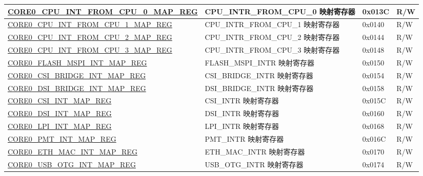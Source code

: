 \begin{longtable}{ | p{8.7cm} | p{6.2cm} | p{1.3cm} | p{1cm} | }
\hyperref[regdesc:CORE0CPUINTFROMCPU0MAPREG]{CORE0\_CPU\_INT\_FROM\_CPU\_0\_MAP\_REG} & CPU\_INTR\_FROM\_CPU\_0 映射寄存器 & 0x013C & R/W \\ \hline

\hyperref[regdesc:CORE0CPUINTFROMCPU1MAPREG]{CORE0\_CPU\_INT\_FROM\_CPU\_1\_MAP\_REG} & CPU\_INTR\_FROM\_CPU\_1 映射寄存器 & 0x0140 & R/W \\ \hline

\hyperref[regdesc:CORE0CPUINTFROMCPU2MAPREG]{CORE0\_CPU\_INT\_FROM\_CPU\_2\_MAP\_REG} & CPU\_INTR\_FROM\_CPU\_2 映射寄存器 & 0x0144 & R/W \\ \hline

\hyperref[regdesc:CORE0CPUINTFROMCPU3MAPREG]{CORE0\_CPU\_INT\_FROM\_CPU\_3\_MAP\_REG} & CPU\_INTR\_FROM\_CPU\_3 映射寄存器 & 0x0148 & R/W \\ \hline

\hyperref[regdesc:CORE0FLASHMSPIINTMAPREG]{CORE0\_FLASH\_MSPI\_INT\_MAP\_REG} & FLASH\_MSPI\_INTR 映射寄存器 & 0x0150 & R/W \\ \hline

\hyperref[regdesc:CORE0CSIBRIDGEINTMAPREG]{CORE0\_CSI\_BRIDGE\_INT\_MAP\_REG} & CSI\_BRIDGE\_INTR 映射寄存器 & 0x0154 & R/W \\ \hline

\hyperref[regdesc:CORE0DSIBRIDGEINTMAPREG]{CORE0\_DSI\_BRIDGE\_INT\_MAP\_REG} & DSI\_BRIDGE\_INTR 映射寄存器 & 0x0158 & R/W \\ \hline

\hyperref[regdesc:CORE0CSIINTMAPREG]{CORE0\_CSI\_INT\_MAP\_REG} & CSI\_INTR 映射寄存器 & 0x015C & R/W \\ \hline

\hyperref[regdesc:CORE0DSIINTMAPREG]{CORE0\_DSI\_INT\_MAP\_REG} & DSI\_INTR 映射寄存器 & 0x0160 & R/W \\ \hline


\hyperref[regdesc:CORE0LPIINTMAPREG]{CORE0\_LPI\_INT\_MAP\_REG} & LPI\_INTR 映射寄存器 & 0x0168 & R/W \\ \hline

\hyperref[regdesc:CORE0PMTINTMAPREG]{CORE0\_PMT\_INT\_MAP\_REG} & PMT\_INTR 映射寄存器 & 0x016C & R/W \\ \hline

\hyperref[regdesc:CORE0SBDINTMAPREG]{CORE0\_ETH\_MAC\_INT\_MAP\_REG} & ETH\_MAC\_INTR 映射寄存器 & 0x0170 & R/W \\ \hline

\hyperref[regdesc:CORE0USBOTGINTMAPREG]{CORE0\_USB\_OTG\_INT\_MAP\_REG} & USB\_OTG\_INTR 映射寄存器 & 0x0174 & R/W \\ \hline


\end{longtable}
